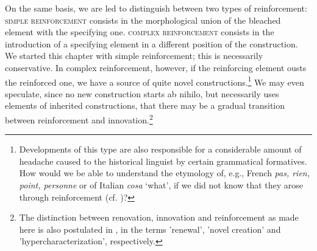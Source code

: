 On the same basis, we are led to distinguish between two types of reinforcement: \textsc{simple reinforcement} consists in the morphological union of the bleached element with the specifying one. \textsc{complex reinforcement} consists in the introduction of a specifying element in a different position of the construction. We started this chapter with simple reinforcement; this is necessarily conservative. In complex reinforcement, however, if the reinforcing element ousts the reinforced one, we have a source of quite novel constructions.\footnote{Developments of this type are also responsible for a considerable amount of headache caused to the historical linguist by certain grammatical formatives. How would we be able to understand the etymology of, e.g., French \textit{pas, rien, point, personne} or of Italian \textit{cosa} ‘what’, if we did not know that they arose through reinforcement (cf. )?} We may even speculate, since no new construction starts ab nihilo, but necessarily uses elements of inherited constructions, that there may be a gradual transition between reinforcement and innovation.\footnote{The distinction between renovation, innovation and reinforcement as made here is also postulated in \citet[115]{Kahr1976}, in the terms 'renewal', 'novel creation' and 'hypercharacterization', respectively.}